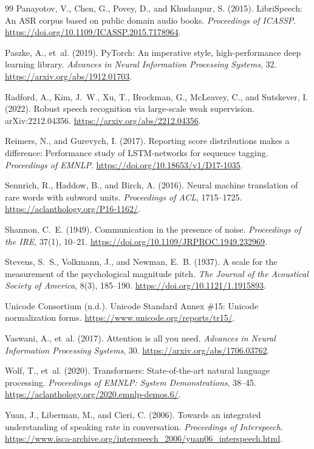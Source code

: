 \begin{thebibliography}{99}
Panayotov, V., Chen, G., Povey, D., and Khudanpur, S. (2015).
LibriSpeech: An ASR corpus based on public domain audio books.
\emph{Proceedings of ICASSP}.
\url{https://doi.org/10.1109/ICASSP.2015.7178964}.

Paszke, A., et~al. (2019). PyTorch: An imperative style, high-performance deep
learning library. \emph{Advances in Neural Information Processing Systems}, 32.
\url{https://arxiv.org/abs/1912.01703}.

Radford, A., Kim, J.~W., Xu, T., Brockman, G., McLeavey, C., and Sutskever, I.
(2022). Robust speech recognition via large-scale weak supervision.
arXiv:2212.04356. \url{https://arxiv.org/abs/2212.04356}.

Reimers, N., and Gurevych, I. (2017). Reporting score distributions makes a
difference: Performance study of LSTM-networks for sequence tagging.
\emph{Proceedings of EMNLP}.
\url{https://doi.org/10.18653/v1/D17-1035}.

Sennrich, R., Haddow, B., and Birch, A. (2016).
Neural machine translation of rare words with subword units.
\emph{Proceedings of ACL}, 1715--1725.
\url{https://aclanthology.org/P16-1162/}.

Shannon, C.~E. (1949). Communication in the presence of noise.
\emph{Proceedings of the IRE}, 37(1), 10--21.
\url{https://doi.org/10.1109/JRPROC.1949.232969}.

Stevens, S.~S., Volkmann, J., and Newman, E.~B. (1937).
A scale for the measurement of the psychological magnitude pitch.
\emph{The Journal of the Acoustical Society of America}, 8(3), 185--190.
\url{https://doi.org/10.1121/1.1915893}.

Unicode Consortium (n.d.). Unicode Standard Annex \#15: Unicode normalization
forms. \url{https://www.unicode.org/reports/tr15/}.

Vaswani, A., et~al. (2017). Attention is all you need.
\emph{Advances in Neural Information Processing Systems}, 30.
\url{https://arxiv.org/abs/1706.03762}.

Wolf, T., et~al. (2020). Transformers: State-of-the-art natural language
processing. \emph{Proceedings of EMNLP: System Demonstrations}, 38--45.
\url{https://aclanthology.org/2020.emnlp-demos.6/}.

Yuan, J., Liberman, M., and Cieri, C. (2006).
Towards an integrated understanding of speaking rate in conversation.
\emph{Proceedings of Interspeech}.
\url{https://www.isca-archive.org/interspeech_2006/yuan06_interspeech.html}.

\end{thebibliography}



